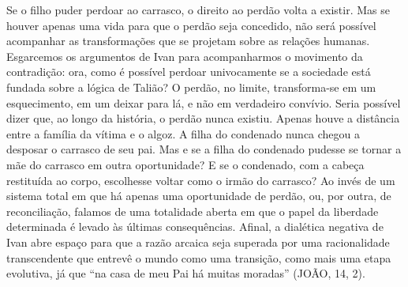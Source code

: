 Se o filho puder perdoar ao carrasco, o direito ao perdão volta a
existir. Mas se houver apenas uma vida para que o perdão seja concedido,
não será possível acompanhar as transformações que se projetam sobre as
relações humanas. Esgarcemos os argumentos de Ivan para acompanharmos o
movimento da contradição: ora, como é possível perdoar univocamente se a
sociedade está fundada sobre a lógica de Talião? O perdão, no limite,
transforma-se em um esquecimento, em um deixar para lá, e não em
verdadeiro convívio. Seria possível dizer que, ao longo da história, o
perdão nunca existiu. Apenas houve a distância entre a família da vítima
e o algoz. A filha do condenado nunca chegou a desposar o carrasco de
seu pai. Mas e se a filha do condenado pudesse se tornar a mãe do
carrasco em outra oportunidade? E se o condenado, com a cabeça
restituída ao corpo, escolhesse voltar como o irmão do carrasco? Ao
invés de um sistema total em que há apenas uma oportunidade de perdão,
ou, por outra, de reconciliação, falamos de uma totalidade aberta em que
o papel da liberdade determinada é levado às últimas consequências.
Afinal, a dialética negativa de Ivan abre espaço para que a razão
arcaica seja superada por uma racionalidade transcendente que entrevê o
mundo como uma transição, como mais uma etapa evolutiva, já que ``na
casa de meu Pai há muitas moradas'' (JOÃO, 14, 2).

